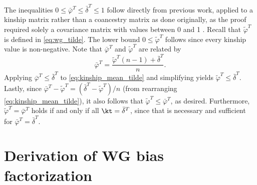 \documentclass[11pt]{article}
\begin{document}
\begin{appendices}
  The inequalities $0 \le \bar{\varphi}^T \le \bar{\delta}^T \le 1$ follow directly from previous work, applied to a kinship matrix rather than a coancestry matrix as done originally, as the proof required solely a covariance matrix with values between 0 and 1 \citep{ochoa_estimating_2021}.
  Recall that $\tilde{\varphi}^T$ is defined in \cref{eq:wg_tilde}.
  The lower bound $0 \le \tilde{\varphi}^T$ follows since every kinship value is non-negative.
  Note that $\bar{\varphi}^T$ and $\tilde{\varphi}^T$ are related by
  \begin{equation}
    \label{eq:kinship_mean_tilde}
    \bar{\varphi}^T
    =
    \frac{ \tilde{\varphi}^T (n-1) + \bar{\delta}^T }{n}.
  \end{equation}
  Applying $\bar{\varphi}^T \le \bar{\delta}^T$ to \cref{eq:kinship_mean_tilde} and simplifying yields $\tilde{\varphi}^T \le \bar{\delta}^T$.
  Lastly, since $\bar{\varphi}^T - \tilde{\varphi}^T = \left( \bar{\delta}^T - \tilde{\varphi}^T \right) / n$ (from rearranging \cref{eq:kinship_mean_tilde}), it also follows that $\tilde{\varphi}^T \le \bar{\varphi}^T$, as desired.
  Furthermore, $\tilde{\varphi}^T = \bar{\varphi}^T$ holds if and only if all $\kt = \bar{\delta}^T$, since that is necessary and sufficient for $\bar{\varphi}^T = \bar{\delta}^T$.

  \section{Derivation of WG bias factorization}
  
  \label{sec:wg_biasfunc}


\end{appendices}
\end{document}

